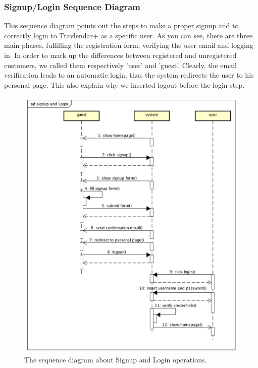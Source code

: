 \subsubsection{Signup/Login Sequence Diagram}

This sequence diagram points out the steps to make a proper signup and to correctly login to Travlendar+ as a specific
user. As you can see, there are three main phases, fulfilling the registration form, verifying the user email and logging in. 
In order to mark up the differences between  registered and  unregistered customers, we called them respectively 'user' and 'guest'. 
Clearly, the email verification leads to an automatic login, thus the system redirects the user to his personal page. This also explain why we inserted logout before the login step. 

\begin{figure}[htp]
	
	\centering
	\includegraphics[width=\textwidth]{sequencediagrams/signup-logIn}
	\caption{The sequence diagram about Signup and Login operations.}
	\label{fig:signup-login} 

\end{figure}
\newpage

